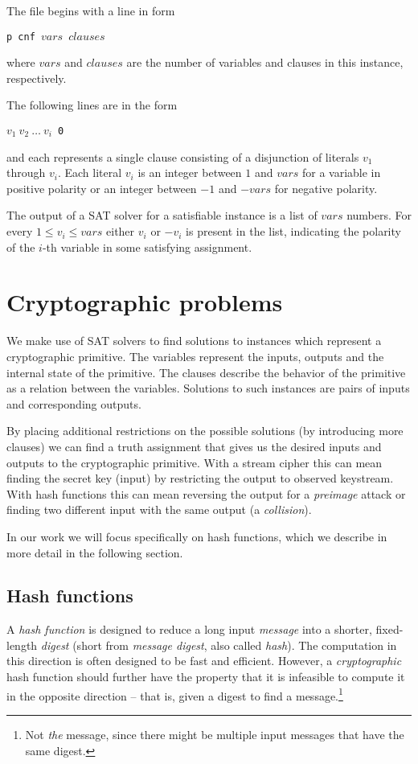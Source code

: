 The file begins with a line in form

\centerline{\texttt{p cnf $vars$ $clauses$}}

\noindent where $vars$ and $clauses$ are the number of variables and clauses in this instance, respectively.

The following lines are in the form

\centerline{\texttt{$v_1 ~ v_2 ~ \ldots ~ v_i$ 0}}

\noindent and each represents a single clause consisting of a disjunction of literals $v_1$ through $v_i$.
Each literal $v_i$ is an integer between $1$ and $vars$ for a variable in positive polarity or an integer between $-1$ and $-vars$ for negative polarity.

The output of a SAT solver for a satisfiable instance is a list of $vars$ numbers.
For every $1 \le v_i \le vars$ either $v_i$ or $-v_i$ is present in the list, indicating the polarity of the $i$-th variable in some satisfying assignment. 

\section{Cryptographic problems}
We make use of SAT solvers to find solutions to instances which represent a cryptographic primitive.
The variables represent the inputs, outputs and the internal state of the primitive.
The clauses describe the behavior of the primitive as a relation between the variables.
Solutions to such instances are pairs of inputs and corresponding outputs.

By placing additional restrictions on the possible solutions (by introducing more clauses) we can find a truth assignment that gives us the desired inputs and outputs to the cryptographic primitive.
With a stream cipher this can mean finding the secret key (input) by restricting the output to observed keystream.
With hash functions this can mean reversing the output for a \emph{preimage} attack or finding two different input with the same output (a \emph{collision}).

In our work we will focus specifically on hash functions, which we describe in more detail in the following section.

\subsection{Hash functions}
\label{sec:hash-functions}
A \emph{hash function} is designed to reduce a long input \emph{message} into a shorter, fixed-length \emph{digest} (short from \emph{message digest}, also called \emph{hash}).
The computation in this direction is often designed to be fast and efficient.
However, a \emph{cryptographic} hash function should further have the property that it is infeasible to compute it in the opposite direction -- that is, given a digest to find a message.\footnote{Not \emph{the} message, since there might be multiple input messages that have the same digest.}

